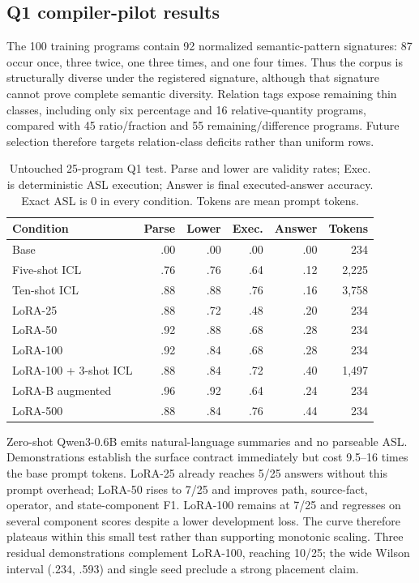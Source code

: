 \documentclass[11pt]{article}
\begin{document}
\subsection{Q1 compiler-pilot results}

The 100 training programs contain 92 normalized semantic-pattern signatures:
87 occur once, three twice, one three times, and one four times. Thus the corpus
is structurally diverse under the registered signature, although that signature
cannot prove complete semantic diversity. Relation tags expose remaining thin
classes, including only six percentage and 16 relative-quantity programs,
compared with 45 ratio/fraction and 55 remaining/difference programs. Future
selection therefore targets relation-class deficits rather than uniform rows.

\begin{table}[t]
\centering\small
\caption{Untouched 25-program Q1 test. Parse and lower are validity rates; Exec.
is deterministic ASL execution; Answer is final executed-answer accuracy. Exact
ASL is 0 in every condition. Tokens are mean prompt tokens.}
\label{tab:asl-pilot}
\begin{tabular}{lrrrrr}
\toprule
Condition & Parse & Lower & Exec. & Answer & Tokens\\
\midrule
Base                  & .00 & .00 & .00 & .00 & 234\\
Five-shot ICL         & .76 & .76 & .64 & .12 & 2,225\\
Ten-shot ICL          & .88 & .88 & .76 & .16 & 3,758\\
LoRA-25               & .88 & .72 & .48 & .20 & 234\\
LoRA-50               & .92 & .88 & .68 & .28 & 234\\
LoRA-100              & .92 & .84 & .68 & .28 & 234\\
LoRA-100 + 3-shot ICL & .88 & .84 & .72 & .40 & 1,497\\
LoRA-B augmented      & .96 & .92 & .64 & .24 & 234\\
LoRA-500              & .88 & .84 & .76 & .44 & 234\\
\bottomrule
\end{tabular}
\end{table}

Zero-shot Qwen3-0.6B emits natural-language summaries and no parseable ASL.
Demonstrations establish the surface contract immediately but cost 9.5--16 times
the base prompt tokens. LoRA-25 already reaches 5/25 answers without this prompt
overhead; LoRA-50 rises to 7/25 and improves path, source-fact, operator, and
state-component F1. LoRA-100 remains at 7/25 and regresses on several component
scores despite a lower development loss. The curve therefore plateaus within
this small test rather than supporting monotonic scaling. Three residual
demonstrations complement LoRA-100, reaching 10/25; the wide Wilson interval
(.234, .593) and single seed preclude a strong placement claim.
\end{document}
